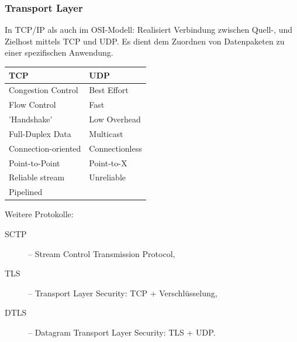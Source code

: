 \documentclass{scrartcl}
\begin{document}
    \subsubsection{Transport Layer}
    \label{subsubsection:OSI_transport_layer}
    In TCP/IP als auch im OSI-Modell: Realisiert Verbindung zwischen Quell-, und Zielhost mittels TCP und UDP. 
    Es dient dem Zuordnen von Datenpaketen zu einer spezifischen Anwendung.
    \begin{center}
        \begin{tabular}{l|l}
        \textbf{TCP} & \textbf{UDP}             \\\hline
        Congestion Control  &   Best Effort     \\
        Flow Control        &   Fast            \\
        'Handshake'         &   Low Overhead    \\
        Full-Duplex Data    &   Multicast       \\
        Connection-oriented &   Connectionless  \\
        Point-to-Point      &   Point-to-X      \\
        Reliable stream     &   Unreliable      \\
        Pipelined           &                   \\
    \end{tabular}
    \end{center}
    Weitere Protokolle:
    \begin{description}
        \item [SCTP] -- Stream Control Transmission Protocol,
        \item [TLS] -- Transport Layer Security: TCP + Verschlüsselung,
        \item [DTLS] -- Datagram Transport Layer Security: TLS + UDP.
    \end{description}
\end{document}
